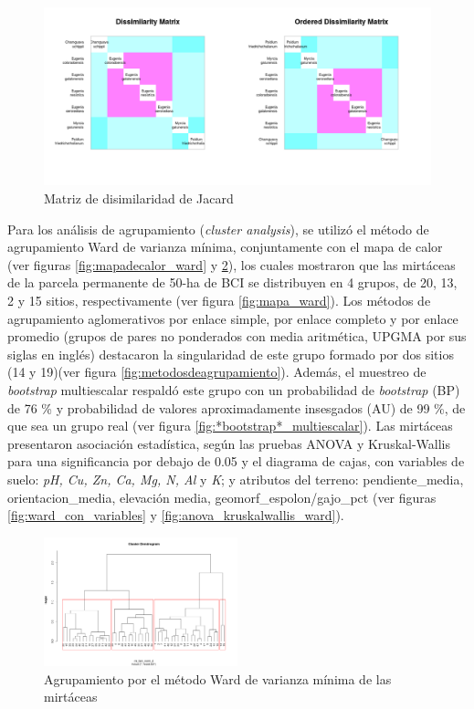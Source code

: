 \documentclass[11pt,]{article}
\begin{document}
\begin{figure}
\centering
\includegraphics{Disimilaridad_.png}
\caption{Matriz de disimilaridad de Jacard \label{fig:matriz_Jacard}}
\end{figure}

Para los análisis de agrupamiento (\emph{cluster analysis}), se utilizó
el método de agrupamiento Ward de varianza mínima, conjuntamente con el
mapa de calor (ver figuras \ref{fig:mapadecalor_ward} y
\ref{fig:ward_fraccionado}), los cuales mostraron que las mirtáceas de
la parcela permanente de 50-ha de BCI se distribuyen en 4 grupos, de 20,
13, 2 y 15 sitios, respectivamente (ver figura \ref{fig:mapa_ward}). Los
métodos de agrupamiento aglomerativos por enlace simple, por enlace
completo y por enlace promedio (grupos de pares no ponderados con media
aritmética, UPGMA por sus siglas en inglés) destacaron la singularidad
de este grupo formado por dos sitios (14 y 19)(ver figura
\ref{fig:metodosdeagrupamiento}). Además, el muestreo de
\emph{bootstrap} multiescalar respaldó este grupo con un probabilidad de
\emph{bootstrap} (BP) de 76 \% y probabilidad de valores aproximadamente
insesgados (AU) de 99 \%, de que sea un grupo real (ver figura
\ref {fig:*bootstrap*_multiescalar}). Las mirtáceas presentaron
asociación estadística, según las pruebas ANOVA y Kruskal-Wallis para
una significancia por debajo de 0.05 y el diagrama de cajas, con
variables de suelo: \emph{pH, Cu, Zn, Ca, Mg, N, Al} y \emph{K}; y
atributos del terreno: pendiente\_media, orientacion\_media, elevación
media, geomorf\_espolon/gajo\_pct (ver figuras
\ref{fig:ward_con_variables} y \ref{fig:anova_kruskalwallis_ward}).

\begin{figure}
\centering
\includegraphics[width=0.50000\textwidth]{ward_fracionado.png}
\caption{Agrupamiento por el método Ward de varianza mínima de las
mirtáceas \label{fig:ward_fraccionado}}
\end{figure}
\end{document}
